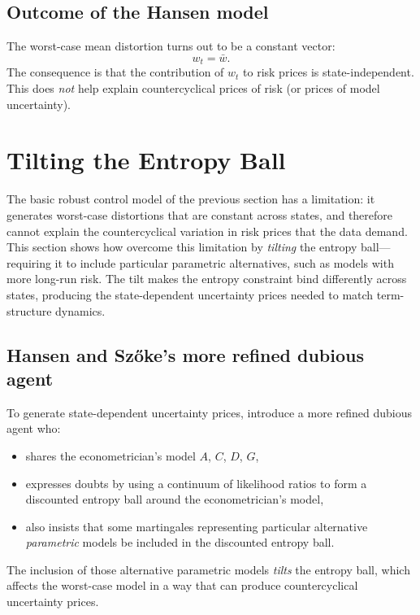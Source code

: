 \documentclass[12pt]{article}
\theoremstyle{definition}
\begin{document}
\subsection{Outcome of the Hansen model}

The worst-case mean distortion turns out to be a constant vector:
\[
   w_t = \bar w.
\]
The consequence is that the contribution of $w_t$ to risk prices is
state-independent.  This does \emph{not} help explain countercyclical
prices of risk (or prices of model uncertainty).


\section{Tilting the Entropy Ball}
\label{sec:tilted}

The basic robust control model of the previous section has a limitation:
it generates worst-case distortions that are constant across states, and
therefore cannot explain the countercyclical variation in risk prices
that the data demand.  This section shows how \citet{HSHS2020}
overcome this limitation by \emph{tilting} the entropy ball---requiring
it to include particular parametric alternatives, such as models with
more long-run risk.  The tilt makes the entropy constraint bind
differently across states, producing the state-dependent uncertainty
prices needed to match term-structure dynamics.

\subsection{Hansen and Sz\H{o}ke's more refined dubious agent}

To generate state-dependent uncertainty prices, \citet{HSHS2020}
introduce a more refined dubious agent who:
\begin{itemize}
\item shares the econometrician's model $A$, $C$, $D$, $G$,
\item expresses doubts by using a continuum of likelihood ratios to form
      a discounted entropy ball around the econometrician's model,
\item also insists that some martingales representing particular
      alternative \emph{parametric} models be included in the
      discounted entropy ball.
\end{itemize}
The inclusion of those alternative parametric models \emph{tilts} the
entropy ball, which affects the worst-case model in a way that can
produce countercyclical uncertainty prices.
\end{document}
